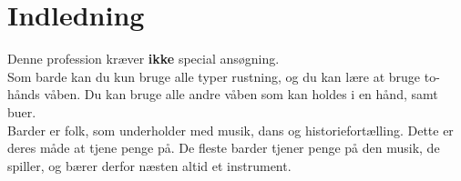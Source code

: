 
\chapter*{Indledning}

Denne profession kræver \textbf{ikke} special ansøgning.\\
Som barde kan du kun bruge alle typer rustning, og du kan lære at bruge to-hånds våben. Du kan bruge alle andre våben som kan holdes i en hånd, samt buer.\\

Barder er folk, som underholder med musik, dans og historiefortælling. Dette er deres måde at tjene penge på. De fleste barder tjener penge på den musik, de spiller, og bærer derfor næsten altid et instrument.
